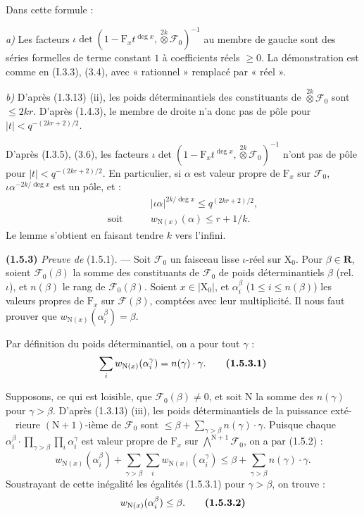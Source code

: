 \documentclass[11pt,leqno]{article}
\newcommand{\Page}[1]{\ifvmode\noindent\else\unskip\ \fi{\footnotesize\textcolor{gray}{[p.\,#1]}}\ \ignorespaces}
\begin{document}
Dans cette formule :

\textit{a)} Les facteurs \(\iota\det(1-\mathrm{F}_x t^{\deg x},\mathop{\otimes}\limits^{2k}\mathcal{F}_0)^{-1}\) au membre de gauche sont des séries formelles de terme constant \(1\) à coefficients réels \(\ge0\). La démonstration est comme en (I.3.3), (3.4), avec « rationnel » remplacé par « réel ».

\textit{b)} D’après (1.3.13) (ii), les poids déterminantiels des constituants de \(\mathop{\otimes}\limits^{2k}\mathcal{F}_0\) sont \(\le2kr\). D’après (1.4.3), le membre de droite n’a donc pas de pôle pour \(|t|<q^{-(2kr+2)/2}\).

D’après (I.3.5), (3.6), les facteurs \(\iota\det(1-\mathrm{F}_x t^{\deg x},\mathop{\otimes}\limits^{2k}\mathcal{F}_0)^{-1}\) n’ont pas de pôle pour \(|t|<q^{-(2kr+2)/2}\). En particulier, si \(\alpha\) est valeur propre de \(\mathrm{F}_x\) sur \(\mathcal{F}_0\), \(\iota\alpha^{-2k/\deg x}\) est un pôle, et :
\begin{align*}
&|\iota\alpha|^{2k/\deg x}\le q^{(2kr+2)/2},\\
\text{soit}\qquad &w_{\mathrm{N}(x)}(\alpha)\le r+1/k.
\end{align*}
Le lemme s’obtient en faisant tendre \(k\) vers l’infini.

\textbf{(1.5.3)} \textit{Preuve de} (1.5.1). — Soit \(\mathcal{F}_0\) un faisceau lisse \(\iota\)-réel sur \(\mathrm{X}_0\). Pour \(\beta\in\mathbf{R}\), soient \(\mathcal{F}_0(\beta)\) la somme des constituants de \(\mathcal{F}_0\) de poids déterminantiels \(\beta\) (rel. \(\iota\)), et \(n(\beta)\) le rang de \(\mathcal{F}_0(\beta)\). Soient \(x\in|\mathrm{X}_0|\), et \(\alpha_i^\beta\) (\(1\le i\le n(\beta)\)) les valeurs propres de \(\mathrm{F}_x\) sur \(\mathcal{F}(\beta)\), comptées avec leur multiplicité. Il nous faut prouver que \(w_{\mathrm{N}(x)}(\alpha_i^\beta)=\beta\).

Par définition du poids déterminantiel, on a pour tout \(\gamma\) :
\[
\sum_i w_{\mathrm{N}(x)}(\alpha_i^\gamma)=n(\gamma)\cdot\gamma.
\tag*{\textbf{(1.5.3.1)}}
\]

Supposons, ce qui est loisible, que \(\mathcal{F}_0(\beta)\ne0\), et soit \(\mathrm{N}\) la somme des \(n(\gamma)\) pour \(\gamma>\beta\). D’après (1.3.13) (iii), les poids déterminantiels de la puissance exté-\Page{165}rieure \((\mathrm{N}+1)\)-ième de \(\mathcal{F}_0\) sont \(\le\beta+\sum\limits_{\gamma>\beta}n(\gamma)\cdot\gamma\). Puisque chaque \(\alpha_i^\beta\cdot\prod\limits_{\gamma>\beta}\prod\limits_i \alpha_i^\gamma\) est valeur propre de \(\mathrm{F}_x\) sur \(\bigwedge\limits^{\mathrm{N}+1}\mathcal{F}_0\), on a par (1.5.2) :
\[
w_{\mathrm{N}(x)}(\alpha_i^\beta)
+\sum_{\gamma>\beta}\sum_i w_{\mathrm{N}(x)}(\alpha_i^\gamma)
\le\beta+\sum_{\gamma>\beta}n(\gamma)\cdot\gamma.
\]
Soustrayant de cette inégalité les égalités (1.5.3.1) pour \(\gamma>\beta\), on trouve :
\[
w_{\mathrm{N}(x)}(\alpha_i^\beta)\le\beta.
\tag*{\textbf{(1.5.3.2)}}
\]
\end{document}
